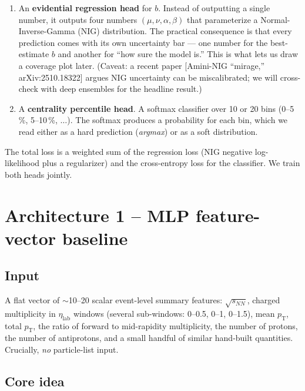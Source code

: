 \documentclass[11pt]{article}
\newcommand{\sqsnn}{\ensuremath{\sqrt{s_{NN}}}}
\newcommand{\pT}{\ensuremath{p_{\text{T}}}}
\newcommand{\etalab}{\ensuremath{\eta_{\text{lab}}}}
\begin{document}
\begin{enumerate}[leftmargin=*]
\item An \textbf{evidential regression head} for $b$. Instead of
      outputting a single number, it outputs four numbers
      $(\mu, \nu, \alpha, \beta)$ that parameterize a
      Normal-Inverse-Gamma (NIG) distribution. The practical
      consequence is that every prediction comes with its own
      uncertainty bar --- one number for the best-estimate
      $b$ and another for ``how sure the model is.'' This is what
      lets us draw a coverage plot later. (Caveat: a recent paper
      [Amini-NIG ``mirage,'' arXiv:2510.18322] argues NIG uncertainty
      can be miscalibrated; we will cross-check with deep ensembles
      for the headline result.)
\item A \textbf{centrality percentile head}. A softmax classifier over
      10 or 20 bins (0--5\,\%, 5--10\,\%, $\dots$). The softmax
      produces a probability for each bin, which we read either as a
      hard prediction (\textit{argmax}) or as a soft distribution.
\end{enumerate}

The total loss is a weighted sum of the regression loss (NIG negative
log-likelihood plus a regularizer) and the cross-entropy loss for the
classifier. We train both heads jointly.

\clearpage
\section{Architecture 1 -- MLP feature-vector baseline}
\label{sec:mlp}

\subsection{Input}

A flat vector of $\sim$10--20 scalar event-level summary features:
$\sqsnn$, charged multiplicity in $\etalab$ windows
(several sub-windows: 0--0.5, 0--1, 0--1.5), mean $\pT$, total $\pT$, the
ratio of forward to mid-rapidity multiplicity, the number of protons,
the number of antiprotons, and a small handful of similar hand-built
quantities. Crucially, \emph{no} particle-list input.

\subsection{Core idea}
\end{document}
